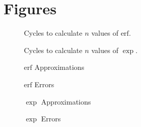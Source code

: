 \documentclass[a4paper, 11pt]{memoir}
\newcommand*{\erf}{\text{erf}}
\begin{document}
    \chapter{Figures}
    \begin{figure}[H]
        \centering
        
        \caption{Cycles to calculate $n$ values of $\erf$.}
    \end{figure}
    \begin{figure}[H]
        \centering
        
        \caption{Cycles to calculate $n$ values of $\exp$.}
    \end{figure}
    
    \begin{figure}[H]
        \centering
        
        \caption{$\erf$ Approximations}
    \end{figure}
    \begin{figure}[H]
        \centering
        
        \caption{$\erf$ Errors}
    \end{figure}
    
    \begin{figure}[H]
        \centering
        
        \caption{$\exp$ Approximations}
    \end{figure}
    \begin{figure}[H]
        \centering
        
        \caption{$\exp$ Errors}
    \end{figure}

    \backmatter
    \printglossaries
    \printbibliography[heading=bibintoc]
\end{document}
